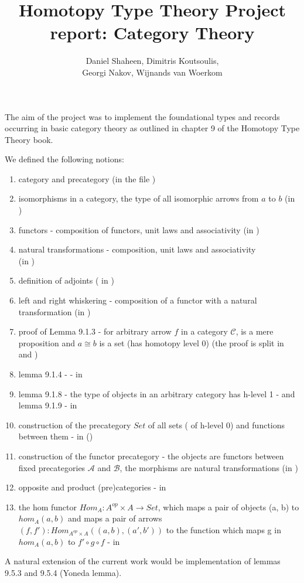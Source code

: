 \documentclass[12pt,a4paper]{article}
\title{Homotopy Type Theory Project report: Category Theory}
\author{Daniel Shaheen, Dimitris Koutsoulis,\\ Georgi Nakov, Wijnands van Woerkom}
\date{}
\begin{document}
\maketitle
The aim of the project was to implement the foundational types and records occurring in basic category theory as outlined in chapter 9 of the Homotopy Type Theory book.

We defined the following notions:
\begin{enumerate}[nosep]
  \item category and precategory (in the file )
  \item isomorphisms in a category, the type  of all isomorphic arrows from $a$ to $b$ (in )
  \item functors - composition of functors, unit laws and associativity (in )
  \item natural transformations - composition, unit laws and associativity \\(in )
  \item definition of adjoints ( in )
  \item left and right whiskering - composition of a functor with a natural transformation (in )
  \item proof of Lemma 9.1.3 - for arbitrary arrow $f$ in a category $\mathcal{C}$,  is a mere proposition and $a \cong b$ is a set (has homotopy level 0) (the proof is split in  and )
  \item lemma 9.1.4 -  - in 
  \item lemma 9.1.8 - the type of objects in an arbitrary category has h-level 1 - and lemma 9.1.9 - in  
  \item construction of the precategory $\mathit{Set}$ of all sets ( of h-level 0) and functions between them - in ()
  \item construction of the functor precategory - the objects are functors between fixed precategories $\mathcal{A}$ and $\mathcal{B}$, the morphisms are natural transformations (in )
  \item opposite and product (pre)categories - in 
  \item the hom functor $Hom_A : A^{op} \times A \rightarrow Set$, which maps a pair of objects (a, b) to $hom_A(a, b)$ and maps a pair of arrows $(f , f') : Hom_{A^{op} \times A} ((a, b), (a', b'))$ to the function which maps g in $hom_A(a, b)$ to $f' \circ g \circ f$ - in 
\end{enumerate}
A natural extension of the current work would be implementation of lemmas 9.5.3 and 9.5.4 (Yoneda lemma).
\end{document}
